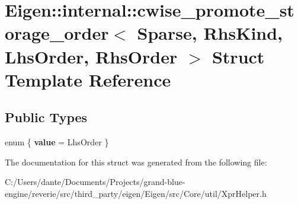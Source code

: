 \hypertarget{struct_eigen_1_1internal_1_1cwise__promote__storage__order_3_01_sparse_00_01_rhs_kind_00_01_lhs_order_00_01_rhs_order_01_4}{}\section{Eigen\+::internal\+::cwise\+\_\+promote\+\_\+storage\+\_\+order$<$ Sparse, Rhs\+Kind, Lhs\+Order, Rhs\+Order $>$ Struct Template Reference}
\label{struct_eigen_1_1internal_1_1cwise__promote__storage__order_3_01_sparse_00_01_rhs_kind_00_01_lhs_order_00_01_rhs_order_01_4}
\subsection*{Public Types}
\begin{DoxyCompactItemize}
\item 
\mbox{\label{struct_eigen_1_1internal_1_1cwise__promote__storage__order_3_01_sparse_00_01_rhs_kind_00_01_lhs_order_00_01_rhs_order_01_4_acc38b8b9f4fa5bf8304e5cb2fed9d5a6}} 
enum \{ {\bfseries value} = Lhs\+Order
 \}
\end{DoxyCompactItemize}


The documentation for this struct was generated from the following file\+:\begin{DoxyCompactItemize}
\item 
C\+:/\+Users/dante/\+Documents/\+Projects/grand-\/blue-\/engine/reverie/src/third\+\_\+party/eigen/\+Eigen/src/\+Core/util/Xpr\+Helper.\+h\end{DoxyCompactItemize}
